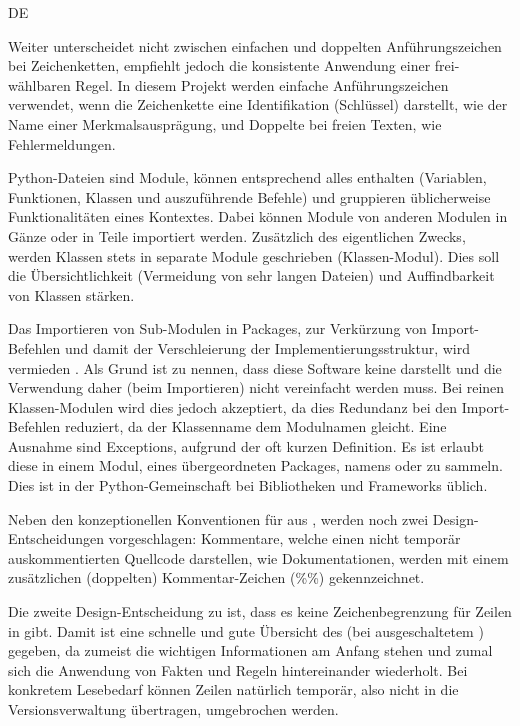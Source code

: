 \begin{enumerateWithCode}[0em plus 1em]{DE}
    \item Weiter unterscheidet  nicht zwischen einfachen und doppelten Anführungszeichen bei Zeichenketten, empfiehlt jedoch die konsistente Anwendung einer frei-wählbaren Regel.
    In diesem Projekt werden einfache Anführungszeichen verwendet, wenn die Zeichenkette eine Identifikation (Schlüssel) darstellt, wie \zB der Name einer Merkmalsausprägung, und Doppelte bei freien Texten, wie Fehlermeldungen.

    \item Python-Dateien sind \sog Module, können entsprechend alles enthalten (Variablen, Funktionen, Klassen und auszuführende Befehle) und gruppieren üblicherweise Funktionalitäten eines Kontextes.
    Dabei können Module von anderen Modulen in Gänze oder in Teile importiert werden.
    Zusätzlich des eigentlichen Zwecks, werden Klassen stets in separate Module geschrieben (Klassen-Modul).
    Dies soll die Übersichtlichkeit (Vermeidung von sehr langen Dateien) und Auffindbarkeit von Klassen stärken.

    \item Das Importieren von Sub-Modulen in Packages, zur Verkürzung von Import-Befehlen und damit der Verschleierung der Implementierungsstruktur, wird vermieden .
    Als Grund ist zu nennen, dass diese Software keine  darstellt und die Verwendung daher (beim Importieren) nicht vereinfacht werden muss.
    Bei reinen Klassen-Modulen wird dies jedoch akzeptiert, da dies Redundanz bei den Import-Befehlen reduziert, da der Klassenname \idR dem Modulnamen gleicht.
    Eine Ausnahme sind Exceptions, aufgrund der oft kurzen Definition.
    Es ist erlaubt diese in einem Modul, eines \ggf übergeordneten Packages, namens  oder  zu sammeln.
    Dies ist in der Python-Gemeinschaft bei Bibliotheken und Frameworks üblich.

    \item Neben den konzeptionellen Konventionen für  aus , werden noch zwei Design-Entscheidungen vorgeschlagen:
    Kommentare, welche einen nicht temporär auskommentierten Quellcode darstellen, wie Dokumentationen, werden mit einem zusätzlichen (doppelten) Kommentar-Zeichen (\%\%) gekennzeichnet.

    \item Die zweite Design-Entscheidung zu  ist, dass es keine Zeichenbegrenzung für Zeilen in  gibt.
    Damit ist eine schnelle und gute Übersicht des  (bei ausgeschaltetem  ) gegeben, da zumeist die wichtigen Informationen am Anfang stehen und zumal sich die Anwendung von Fakten und Regeln hintereinander wiederholt.
    Bei konkretem Lesebedarf können Zeilen natürlich temporär, also nicht in die Versionsverwaltung übertragen, umgebrochen werden.


\end{enumerateWithCode}

